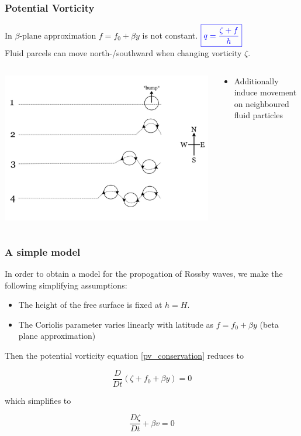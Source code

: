 \documentclass[12pt]{beamer}
\begin{document}
\begin{frame}
\frametitle{Potential Vorticity}
In $\beta$-plane approximation $f=f_0+\beta y$ is not constant. \hfill $\color{blue}\boxed{q=\frac{\zeta+f}{h}}$\\
\vspace{0.5cm}
Fluid parcels can move north-/southward when changing vorticity $\zeta$.
\begin{columns}
\begin{column}{0.55\textwidth}
\includegraphics[width=\linewidth]{beta_plane}
\end{column}
\begin{column}{0.45\textwidth}
\begin{itemize}
	\item Additionally induce movement on neighboured fluid particles
\end{itemize}
\end{column}
\end{columns}
\end{frame}

\begin{frame}[fragile]
\frametitle{A simple model}

In order to obtain a model for the propogation of Rossby waves, we make the following simplifying assumptions:

 \begin{itemize}
\item The height of the free surface is fixed at $h=H$.
\item The Coriolis parameter varies linearly with latitude as $f=f_0+\beta y$ (beta plane approximation)
\end{itemize}

Then the potential vorticity equation \eqref{pv_conservation} reduces to

\[
\frac{D}{Dt}\left(\zeta+f_0+\beta y\right)=0
\]

which simplifies to

\[
\frac{D\zeta}{Dt}+\beta v=0
\]
\end{frame}
\end{document}
